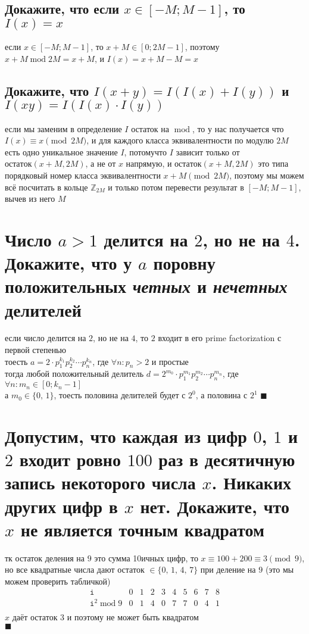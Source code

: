 \documentclass{article}
\newcommand{\Mod}[1]{\pmod{#1}}
\renewcommand{\mod}{\operatorname{mod}}
\begin{document}
  \subsection{Докажите, что если $x \in [-M; M-1]$, то $I(x) = x$}
  если $x \in [-M; M-1]$, то $x+M \in [0; 2M-1]$, поэтому $ x+M \operatorname{mod} 2M = x+M $, и $ I(x) = x+M-M = x$
  \subsection{Докажите, что $I(x+y) = I(I(x)+I(y))$ и $I(xy) = I(I(x) \cdot I(y))$}
  если мы заменим в определение $I$ остаток на $\operatorname{mod}$, то у нас получается что $I(x) \equiv x \Mod{2M}$,
  и для каждого класса эквивалентности по модулю $2M$ есть одно уникальное значение $I$,
  потомучто $I$ зависит только от $остаток(x+M, 2M)$, а не от $x$ напрямую,
  и $остаток(x+M, 2M)$ это типа порядковый номер класса эквивалентности $x+M \Mod{2M}$,
  поэтому мы можем всё посчитать в кольце $\mathbb{Z}_{2M}$
  и только потом перевести результат в $[-M; M-1]$, вычев из него $M$

  \section{Число $a > 1$ делится на $2$, но не на $4$. Докажите, что у $a$ поровну положительных \textit{четных} и \textit{нечетных} делителей}
  если число делится на $2$, но не на $4$, то $2$ входит в его prime factorization с первой степенью \\
  тоесть $a = 2 \cdot p_1^{k_1}p_2^{k_2} \cdots p_n^{k_n}$, где $\forall n:p_n>2$ и простые \\
  тогда любой положительный делитель $d = 2^{m_0} \cdot p_1^{m_1}p_2^{m_2} \cdots p_n^{m_n}$, где $\forall n:m_n \in [0;k_n-1]$ \\
  а $m_0 \in \{0,\,1\}$, тоесть половина делителей будет с $2^0$, а половина с $2^1$ $\blacksquare$

  \section{Допустим, что каждая из цифр $0$, $1$ и $2$ входит ровно $100$ раз в десятичную запись некоторого числа $x$. Никаких других цифр в $x$ нет. Докажите, что $x$ не является точным квадратом}
  тк остаток деления на $9$ это сумма 10ичных цифр, то $x \equiv 100+200 \equiv 3 \Mod{9}$, \\
  но все квадратные числа дают остаток $\in \{0,\, 1,\, 4,\, 7\}$ при деление на $9$ (это мы можем проверить табличкой)
  \[
    \begin{array}{c|cccccccccc}
      \texttt{i} & 0 & 1 & 2 & 3 & 4 & 5 & 6 & 7 & 8 \\
      \hline
      \texttt{i}^2 \mod 9 & 0 & 1 & 4 & 0 & 7 & 7 & 0 & 4 & 1 \\
    \end{array}
  \]
  $x$ даёт остаток $3$ и поэтому не может быть квадратом \\
  $\blacksquare$
\end{document}
